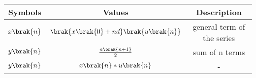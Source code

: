 \begin{tabular}{|c|c|c|}
    \hline
    \textbf{Symbols} & \textbf{Values} & \textbf{Description} \\
    \hline
    $x\brak{n}$ & $\brak{x\brak{0} + nd}\brak{u\brak{n}}$ & general term of the series \\
    \hline
    $y\brak{n}$ & $ \frac{n\brak{n+1}}{2}$ & sum of n terms \\
    \hline
    $y\brak{n}$ & $x\brak{n} * u\brak{n}$ & - \\
    \hline
\end{tabular}
